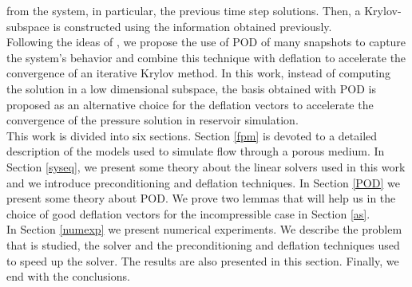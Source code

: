 \documentclass[review]{elsarticle}
\begin{document}
from the system, in particular, the previous time step solutions. Then, a Krylov-subspace is constructed using the 
information obtained previously.\\
Following the ideas of \cite{Astrid11,Mark06,Pasetto16,Carlberg15}, we propose the use of POD of many snapshots 
to capture the system's behavior and combine this technique with deflation to accelerate the convergence of 
an iterative Krylov method.
In this work, instead of computing the solution in a low dimensional subspace, the basis obtained with POD is 
proposed as an alternative choice for the deflation vectors 
to accelerate the convergence of the pressure solution in reservoir simulation.  \\
This work is divided into six sections. 
  Section \ref{fpm} is devoted to a detailed description of the models used to simulate flow through a porous medium. In Section \ref{syseq}, we present some theory about the linear solvers used in this work and we introduce preconditioning 
  and deflation techniques. 
  In Section \ref{POD} we present some theory about POD. We prove two lemmas that will help us in the choice of good deflation vectors for the 
  incompressible case in Section \ref{as}.\\
 In Section \ref{numexp} we present numerical experiments. We describe the problem that is studied, the solver and the preconditioning and deflation techniques used to speed up the solver. The results are also presented
 in this section.
 Finally, we end with the conclusions.
\end{document}

